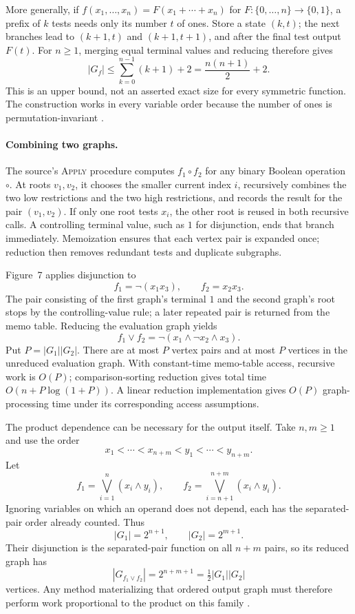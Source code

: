 More generally, if
\(f(x_1,\ldots,x_n)=F(x_1+\cdots+x_n)\) for
\(F:\{0,\ldots,n\}\to\{0,1\}\), a prefix of \(k\) tests
needs only its number \(t\) of ones. Store a state \((k,t)\);
the next branches lead to \((k+1,t)\) and \((k+1,t+1)\),
and after the final test output \(F(t)\).
For \(n\geq1\), merging equal terminal values and reducing
therefore gives
\[
 |G_f|\leq\sum_{k=0}^{n-1}(k+1)+2
          =\frac{n(n+1)}2+2.
\]
This is an upper bound, not an asserted exact size for
every symmetric function. The construction works in
every variable order because the number of ones is
permutation-invariant \cite[\S3.1]{Bryant1986}.

\paragraph{Combining two graphs.}
The source's \textsc{Apply} procedure computes \(f_1\mathbin{\circ}f_2\) for
any binary Boolean operation \(\circ\).  At roots \(v_1,v_2\), it chooses the
smaller current index \(i\), recursively combines the two low restrictions and
the two high restrictions, and records the result for the pair
\((v_1,v_2)\).  If only one root tests \(x_i\), the other root is reused in both
recursive calls.  A controlling terminal value, such as \(1\) for disjunction,
ends that branch immediately.  Memoization ensures that each vertex pair is
expanded once; reduction then removes redundant tests and duplicate subgraphs.

Figure~7 applies disjunction to
\[
 f_1=\neg(x_1x_3),
 \qquad
 f_2=x_2x_3.
\]
The pair consisting of the first graph's terminal \(1\) and the second graph's
root stops by the controlling-value rule; a later repeated pair is returned
from the memo table.  Reducing the evaluation graph yields
\[
 f_1\lor f_2=\neg(x_1\land\neg x_2\land x_3).
\]
Put \(P=|G_1||G_2|\). There are at most \(P\) vertex pairs and at most \(P\)
vertices in the unreduced evaluation graph. With constant-time memo-table
access, recursive work is \(O(P)\); comparison-sorting reduction gives total
time \(O(n+P\log(1+P))\). A linear reduction implementation gives \(O(P)\)
graph-processing time under its corresponding access assumptions.

The product dependence can be necessary for the output itself.
Take \(n,m\geq1\) and use the order
\[
 x_1<\cdots<x_{n+m}<y_1<\cdots<y_{n+m}.
\]
Let
\[
 f_1=\bigvee_{i=1}^{n}(x_i\land y_i),\qquad
 f_2=\bigvee_{i=n+1}^{n+m}(x_i\land y_i).
\]
Ignoring variables on which an operand does not depend, each
has the separated-pair order already counted. Thus
\[
 |G_1|=2^{n+1},\qquad |G_2|=2^{m+1}.
\]
Their disjunction is the separated-pair function on all
\(n+m\) pairs, so its reduced graph has
\[
 |G_{f_1\lor f_2}|=2^{n+m+1}
                 =\tfrac12|G_1||G_2|
\]
vertices. Any method materializing that ordered output graph
must therefore perform work proportional to the product
on this family \cite[\S4.3]{Bryant1986}.

